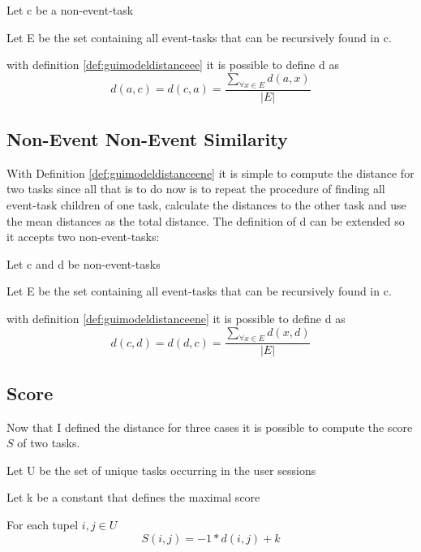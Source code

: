 \begin{definition}
	\item Let c be a non-event-task
	\item Let E be the set containing all event-tasks that can be recursively found in c.
	\item with definition \ref{def:guimodeldistanceee} it is possible to define d as
\begin{equation*}
	d(a,c) = d(c,a) = \frac{\sum_{\forall x \in E} d(a,x)}{|E|}
\end{equation*}
\label{def:guimodeldistanceene}
\end{definition}

\subsection{Non-Event Non-Event Similarity}
With Definition \ref{def:guimodeldistanceene} it is simple to compute the distance for two tasks since all that is to do now is to repeat the procedure of finding all event-task children of one task, calculate the distances to the other task and use the mean distances as the total distance.
The definition of d can be extended so it accepts two non-event-tasks:

\begin{definition}
	\item Let c and d be non-event-tasks 
	\item Let E be the set containing all event-tasks that can be recursively found in c.
	\item with definition \ref{def:guimodeldistanceene} it is possible to define d as
	\begin{equation*}
		d(c,d) = d(d,c) = \frac{\sum_{\forall x \in E} d(x,d)}{|E|}
	\end{equation*}
\label{def:guimodeldistancenene}
\end{definition}
\subsection{Score}
Now that I defined the distance for three cases it is possible to compute the score $S$ of two tasks.
\begin{definition}
	\item Let U be the set of unique tasks occurring in the user sessions
	\item Let k be a constant that defines the maximal score 
	\item For each tupel $i,j \in U$ 
\begin{equation*}
		 S(i,j) = -1*d(i,j)+k
	\label{eq:subscore}
\end{equation*}
\end{definition}


